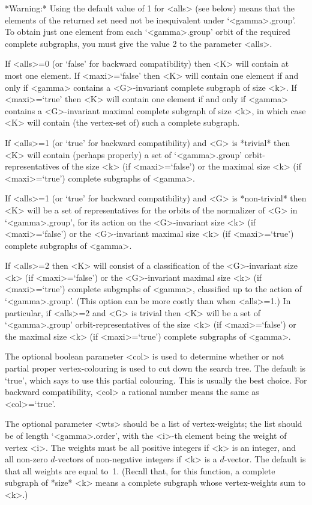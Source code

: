 *Warning:* Using the default value of 1 for <alls> (see below) means
that the elements of the returned set need not be inequivalent under
`<gamma>.group'. To obtain just one element from each `<gamma>.group'
orbit of the required complete subgraphs, you must give the value 2 to
the parameter <alls>.

If <alls>=0 (or `false' for backward compatibility) then <K> will contain
at most one element.  If <maxi>=`false' then <K> will contain one element
if and only if <gamma> contains a <G>-invariant complete subgraph of
size <k>.  If <maxi>=`true' then <K> will contain one element if and
only if <gamma> contains a <G>-invariant maximal complete subgraph
of size <k>, in which case <K> will contain (the vertex-set of) such
a complete subgraph.  

If <alls>=1 (or `true' for backward compatibility) and <G> is *trivial*
then <K> will contain (perhaps properly) a set of `<gamma>.group'
orbit-representatives of the size <k> (if <maxi>=`false') or the maximal
size <k> (if <maxi>=`true') complete subgraphs of <gamma>.

If <alls>=1 (or `true' for backward compatibility) and <G> is
*non-trivial* then <K> will be a set of representatives for the orbits
of the normalizer of <G> in `<gamma>.group', for its action on the
<G>-invariant size <k> (if <maxi>=`false') or the <G>-invariant maximal
size <k> (if <maxi>=`true') complete subgraphs of <gamma>.

If <alls>=2 then <K> will consist of a classification of the <G>-invariant
size <k> (if <maxi>=`false') or the <G>-invariant maximal size <k> (if
<maxi>=`true') complete subgraphs of <gamma>, classified up to the action
of `<gamma>.group'. (This option can be more costly than when <alls>=1.)
In particular, if <alls>=2 and <G> is trivial then <K> will be a set of
`<gamma>.group' orbit-representatives of the size <k> (if <maxi>=`false')
or the maximal size <k> (if <maxi>=`true') complete subgraphs of <gamma>.

The optional boolean parameter <col> is used to determine whether or not
partial proper vertex-colouring is used to cut down the search tree. The
default is `true', which says to use this partial colouring. This is
usually the best choice. For backward compatibility, <col> a rational
number means the same as <col>=`true'.

The optional parameter <wts> should be a list of vertex-weights; the list
should be of length `<gamma>.order', with the <i>-th element being the
weight of vertex <i>. The weights must be all positive integers if <k>
is an integer, and all non-zero $d$-vectors of non-negative integers
if <k> is a $d$-vector. The default is that all weights are equal to~1.
(Recall that, for this function, a complete subgraph of *size* <k> 
means a complete subgraph whose vertex-weights sum to <k>.)

